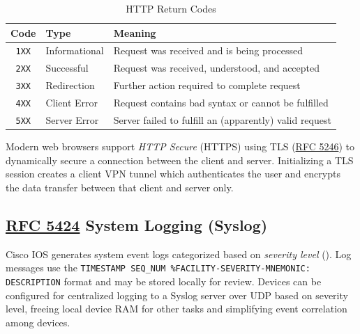 \documentclass[12pt]{article}
\newcommand{\RFC}[1]{\href{https://datatracker.ietf.org/doc/html/rfc#1}{RFC #1}}
\begin{document}
	\begin{table}[H]
	\centering
	\caption{HTTP Return Codes \label{tab:HTTP CODES}}
	\begin{tabular}{@{} c l l @{}}\hline
	\textbf{Code}	& \textbf{Type}	& \textbf{Meaning}\\\hline
	\texttt{1XX}		& Informational	& Request was received and is being processed\\
	\texttt{2XX}		& Successful	& Request was received, understood, and accepted\\
	\texttt{3XX}		& Redirection	& Further action required to complete request\\
	\texttt{4XX}		& Client Error	& Request contains bad syntax or cannot be fulfilled\\
	\texttt{5XX}		& Server Error	& Server failed to fulfill an (apparently) valid request\\\hline
	\end{tabular}\end{table}
	Modern web browsers support \textit{HTTP Secure} (HTTPS) using TLS (\RFC{5246}) to dynamically secure a connection between the client and server. Initializing a TLS session creates a client VPN tunnel which authenticates the user and encrypts the data transfer between that client and server only.


	\subsection[RFC 5424 Syslog]{\RFC{5424} System Logging (Syslog) \label{subsec:SYSLOG}}
	Cisco IOS generates system event logs categorized based on \textit{severity level} (). Log messages use the \texttt{TIMESTAMP SEQ\_NUM \%FACILITY-SEVERITY-MNEMONIC: DESCRIPTION} format and may be stored locally for review. Devices can be configured for centralized logging to a Syslog server over UDP based on severity level, freeing local device RAM for other tasks and simplifying event correlation among devices.
\end{document}
